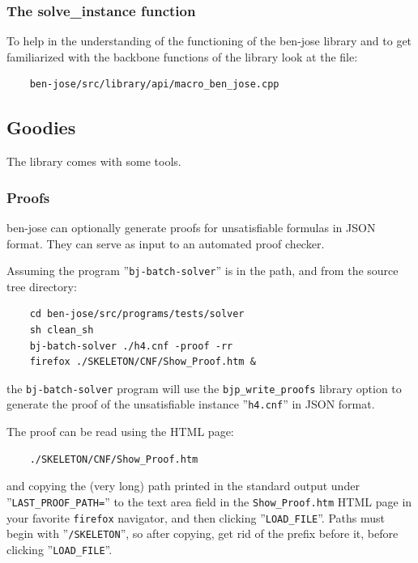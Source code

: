 \documentclass{easychair}
\newcommand{\bjbatchsolver}{\texttt{bj-batch-solver}}
\begin{document}
\subsubsection{The solve\_instance function}

To help in the understanding of the functioning of the ben-jose library and to get 
familiarized with the backbone functions of the library look at the file:

\begin{verbatim}
	ben-jose/src/library/api/macro_ben_jose.cpp
\end{verbatim}

\subsection{Goodies}

The library comes with some tools.

\subsubsection{Proofs}

ben-jose can optionally generate proofs for unsatisfiable formulas in JSON format. They can serve as input to an automated proof checker.

Assuming the program ''{\bjbatchsolver}'' is in the path, and from the source tree directory:

\begin{verbatim}
	cd ben-jose/src/programs/tests/solver
	sh clean_sh
	bj-batch-solver ./h4.cnf -proof -rr
	firefox ./SKELETON/CNF/Show_Proof.htm &
\end{verbatim}

the {\bjbatchsolver} program will use the \texttt{bjp\_write\_proofs} library option to generate the proof of the unsatisfiable instance ''\texttt{h4.cnf}'' in JSON format. 

The proof can be read using the HTML page:

\begin{verbatim}
	./SKELETON/CNF/Show_Proof.htm
\end{verbatim}

and copying the (very long) path printed in the standard output under ''\texttt{LAST\_PROOF\_PATH=}'' to the text area field in the \texttt{Show\_Proof.htm} HTML page in your favorite \texttt{firefox} navigator, and then clicking ''\texttt{LOAD\_FILE}''. Paths must begin with ''\texttt{/SKELETON}'', so after copying, get  rid of the prefix before it, before clicking ''\texttt{LOAD\_FILE}''.
\end{document}
